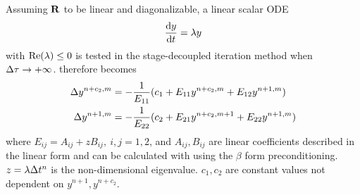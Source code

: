 Assuming $\mathbf{R}$ to be linear and diagonalizable,
a linear scalar ODE
\begin{equation}
    \derivative{y}{t} = \lambda y
\end{equation}
with $\mathrm{Re}(\lambda)\leq 0$
is tested in the stage-decoupled iteration method when
${\Delta} \tau \rightarrow +\infty$.
 therefore becomes
\begin{equation}
    \begin{aligned}
        {\Delta} y^{n+c_2, m} & = -\frac{1}{ E_{11} } (c_1 + E_{11}  y^{n+c_2, m}+ E_{12}  y^{n+1, m})     \\
        {\Delta} y^{n+1, m}   & = -\frac{1}{ E_{22} } (c_2 + E_{21}  y^{n+c_2, m + 1}+ E_{22}  y^{n+1, m})
    \end{aligned}
    \label{eq:scalarGS}
\end{equation}
where $E_{ij}=A_{ij}+zB_{ij},\ i,j=1,2$, and $A_{ij}, B_{ij}$ are
linear coefficients described in the linear form 
and can be calculated with  using the $\beta$ form
preconditioning. $z=\lambda{\Delta} t^n$ is the non-dimensional eigenvalue.
$c_1,c_2$ are constant values not dependent on $y^{n+1}, y^{n+c_2}$.

